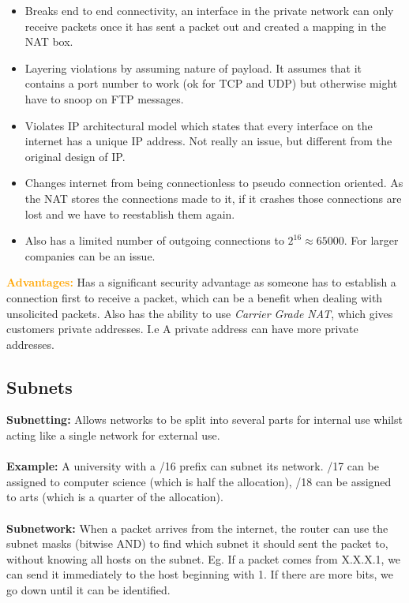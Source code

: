 \documentclass[a4paper,10pt]{article}
\begin{document}
\begin{itemize}
	\item Breaks end to end connectivity, an interface in the private network can only receive packets once it has sent a packet out and created a mapping in the NAT box. 
	\item Layering violations by assuming nature of payload. It assumes that it contains a port number to work (ok for TCP and UDP) but otherwise might have to snoop on FTP messages. 
	\item Violates IP architectural model which states that every interface on the internet has a unique IP address. Not really an issue, but different from the original design of IP. 
	\item Changes internet from being connectionless to pseudo connection oriented. As the NAT stores the connections made to it, if it crashes those connections are lost and we have to reestablish them again. 
	\item Also has a limited number of outgoing connections to $2^{16} \approx 65000$. For larger companies can be an issue.  
\end{itemize}
\textcolor{Orange}{\textbf{Advantages:}} Has a significant security advantage as someone has to establish a connection first to receive a packet, which can be a benefit when dealing with unsolicited packets. Also has the ability to use \emph{Carrier Grade NAT}, which gives customers private addresses. I.e A private address can have more private addresses. 
\subsection{Subnets}
\textcolor{Peach}{\textbf{Subnetting:}} Allows networks to be split into several parts for internal use whilst acting like a single network for external use. \\\\
\textcolor{Peach}{\textbf{Example:}} A university with a /16 prefix can subnet its network. /17 can be assigned to computer science (which is half the allocation), /18 can be assigned to arts (which is a quarter of the allocation). \\\\
\textcolor{Peach}{\textbf{Subnetwork:}} When a packet arrives from the internet, the router can use the subnet masks (bitwise AND) to find which subnet it should sent the packet to, without knowing all hosts on the subnet. Eg. If a packet comes from X.X.X.1, we can send it immediately to the host beginning with 1. If there are more bits, we go down until it can be identified.
\end{document}
